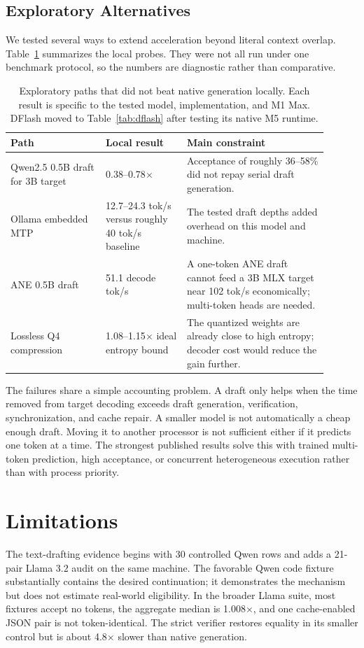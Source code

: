 \documentclass[11pt]{article}
\begin{document}
\subsection{Exploratory Alternatives}
We tested several ways to extend acceleration beyond literal context overlap. Table~\ref{tab:negative} summarizes the local probes. They were not all run under one benchmark protocol, so the numbers are diagnostic rather than comparative.

\begin{table}[H]
\centering
\small
\begin{tabular}{p{0.27\linewidth}p{0.23\linewidth}p{0.40\linewidth}}
\toprule
Path & Local result & Main constraint \\
\midrule
Qwen2.5 0.5B draft for 3B target & 0.38--0.78$\times$ & Acceptance of roughly 36--58\% did not repay serial draft generation. \\
Ollama embedded MTP & 12.7--24.3 tok/s versus roughly 40 tok/s baseline & The tested draft depths added overhead on this model and machine. \\
ANE 0.5B draft & 51.1 decode tok/s & A one-token ANE draft cannot feed a 3B MLX target near 102 tok/s economically; multi-token heads are needed. \\
Lossless Q4 compression & 1.08--1.15$\times$ ideal entropy bound & The quantized weights are already close to high entropy; decoder cost would reduce the gain further. \\
\bottomrule
\end{tabular}
\caption{Exploratory paths that did not beat native generation locally. Each result is specific to the tested model, implementation, and M1 Max. DFlash moved to Table~\ref{tab:dflash} after testing its native M5 runtime.}
\label{tab:negative}
\end{table}

The failures share a simple accounting problem. A draft only helps when the time removed from target decoding exceeds draft generation, verification, synchronization, and cache repair. A smaller model is not automatically a cheap enough draft. Moving it to another processor is not sufficient either if it predicts one token at a time. The strongest published results solve this with trained multi-token prediction, high acceptance, or concurrent heterogeneous execution rather than with process priority.

\section{Limitations}
The text-drafting evidence begins with 30 controlled Qwen rows and adds a 21-pair Llama 3.2 audit on the same machine. The favorable Qwen code fixture substantially contains the desired continuation; it demonstrates the mechanism but does not estimate real-world eligibility. In the broader Llama suite, most fixtures accept no tokens, the aggregate median is 1.008$\times$, and one cache-enabled JSON pair is not token-identical. The strict verifier restores equality in its smaller control but is about 4.8$\times$ slower than native generation.
\end{document}
